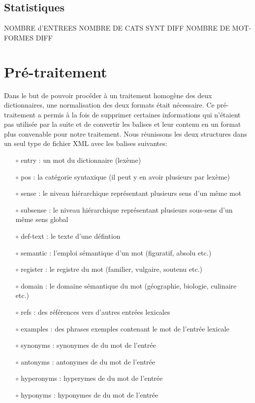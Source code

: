 \documentclass[a4paper, 12pt]{article}
\begin{document}
\subsection{Statistiques}

NOMBRE d'ENTREES
NOMBRE DE CATS SYNT DIFF
NOMBRE DE MOT-FORMES DIFF

\section{Pré-traitement}

Dans le but de pouvoir procéder à un traitement homogène des deux dictionnaires, une normalisation des deux formats était nécessaire. Ce pré-traitement a permis à la fois de supprimer certaines informations qui n'étaient pas utilisée par la suite et de convertir les balises et leur contenu en un format plus convenable pour notre traitement. Nous réunissons les deux structures dans un seul type de fichier XML avec les balises suivantes:

    \begin{itemize}
        \item[$\circ$] entry : un mot du dictionnaire (lexème)
        \item[$\circ$] pos : la catégorie syntaxique (il peut y en avoir plusieurs par lexème)
        \item[$\circ$] sense : le niveau hiérarchique représentant plusieurs sens d'un même mot
        \item[$\circ$] subsense : le niveau hiérarchique représentant plusieurs sous-sens d'un même sens global
        \item[$\circ$] def-text : le texte d'une défintion
        \item[$\circ$] semantic : l'emploi sémantique d'un mot (figuratif, absolu etc.)
        \item[$\circ$] register : le registre du mot (familier, vulgaire, soutenu etc.)
        \item[$\circ$] domain : le domaine sémantique du mot (géographie, biologie, culinaire etc.)
        \item[$\circ$] refs : des références vers d'autres entrées lexicales
        \item[$\circ$] examples : des phrases exemples contenant le mot de l'entrée lexicale
        \item[$\circ$] synonyms : synonymes de du mot de l'entrée
        \item[$\circ$] antonyms : antonymes de du mot de l'entrée
        \item[$\circ$] hyperonyms : hyperymes de du mot de l'entrée
        \item[$\circ$] hyponyms : hyponymes de du mot de l'entrée
    \end{itemize}
\bigskip
\end{document}
